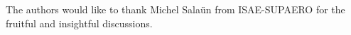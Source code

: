 \documentclass{ifacconf}
\begin{document}
\begin{ack}
The authors would like to thank Michel Sala\"un from ISAE-SUPAERO for the fruitful and insightful discussions.
\end{ack}

                                                   







\appendix

      
\end{document}
